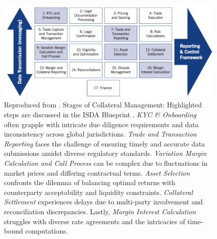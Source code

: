 \begin{itemize}
    \begin{figure}[!h]
        \centering
        \includegraphics[width=\textwidth]{images/chapter-2/collateral-challenges.pdf}
        \caption[Collateral Management Processes]{Reproduced from \cite{isda_blueprint_collateral_processing}. Stages of Collateral Management: Highlighted steps are discussed in the ISDA Blueprint \citep{isda_blueprint_collateral_processing}. \textit{KYC \& Onboarding} often grapple with intricate due diligence requirements and data inconsistency across global jurisdictions. \textit{Trade and Transaction Reporting} faces the challenge of ensuring timely and accurate data submissions amidst diverse regulatory standards.\textit{ Variation Margin Calculation and Call Process} can be complex due to fluctuations in market prices and differing contractual terms. \textit{Asset Selection} confronts the dilemma of balancing optimal returns with counterparty acceptability and liquidity constraints.\textit{ Collateral Settlement} experiences delays due to multi-party involvement and reconciliation discrepancies. Lastly,\textit{ Margin Interest Calculation} struggles with diverse rate agreements and the intricacies of time-bound computations.}
        \label{fig:collateral_mgmt_steps}
    \end{figure}
    
\end{itemize}